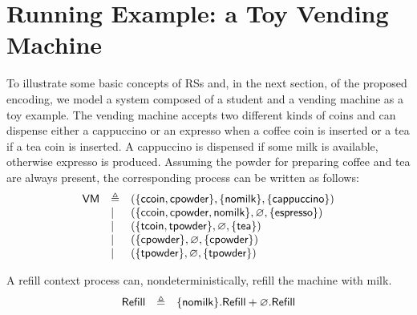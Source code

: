 
\section{Running Example: a Toy Vending Machine}\label{sec:student}

To illustrate some basic concepts of RSs and, in the next section, of the proposed \GROOVE encoding, we model a system composed of a student and a vending machine as a toy example.
The vending machine accepts two different kinds of coins and can dispense either a cappuccino or an expresso when a coffee coin is inserted or a tea if a tea coin is inserted. A cappuccino is dispensed if some milk is available, otherwise expresso is produced.
Assuming the powder for preparing coffee and tea are always present, the corresponding process can be written as follows:
\[
\begin{array}{lll}
\mathsf{VM} & \triangleq & (\{{\text{\sffamily ccoin}},{\text{\sffamily cpowder}}\},\{{\text{\sffamily nomilk}}\},\{{\text{\sffamily cappuccino}}\})\\
& | & (\{{\text{\sffamily ccoin}},{\text{\sffamily cpowder}},{\text{\sffamily nomilk}}\},\varnothing,\{{\text{\sffamily espresso}}\})\\
& | & (\{{\text{\sffamily tcoin}},{\text{\sffamily tpowder}}\},\varnothing,\{{\text{\sffamily tea}}\})\\
& | & (\{{\text{\sffamily cpowder}}\},\varnothing,\{{\text{\sffamily cpowder}}\})\\
& | & (\{{\text{\sffamily tpowder}}\},\varnothing,\{{\text{\sffamily tpowder}}\})\\
\end{array}
\]

A refill context process can, nondeterministically, refill the machine with milk.
\[
\begin{array}{lll}
\mathsf{Refill} & \triangleq & \{{\text{\sffamily nomilk}}\}.\mathsf{Refill}
+ \varnothing.\mathsf{Refill}
\end{array}
\]


